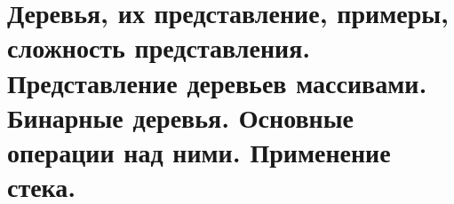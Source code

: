 \section{Деревья, их представление, примеры, сложность представления. Представление деревьев массивами. Бинарные деревья. Основные операции над ними. Применение стека.}
